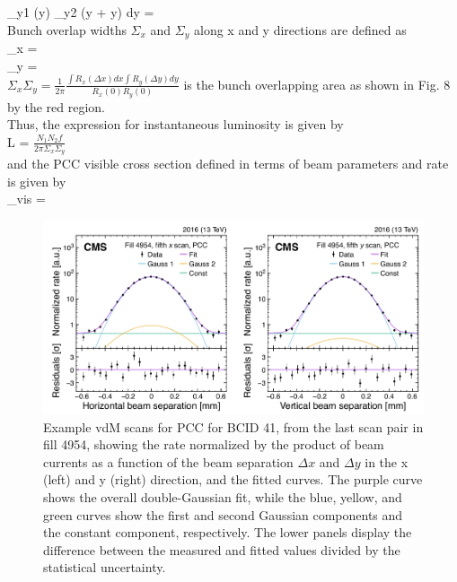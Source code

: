 \int \rho_{y1} (y) \rho_{y2} (y + \Delta y) dy =  \\

Bunch overlap widths $\Sigma_x$ and $\Sigma_y$ along x and y directions are defined as \\

\Sigma_x =   \\

\Sigma_y =    \\

$\Sigma_x \Sigma_y = \frac{1}{2 \pi} \frac{\int R_x(\Delta x)dx \int R_y(\Delta y) dy}{R_x(0) R_y(0)}$  is the bunch overlapping area as shown in Fig. 8 by the red region.\\

Thus, the expression for instantaneous luminosity is given by \\

L = $\frac{N_1 N_2 f}{2\pi \Sigma_x \Sigma_y}$ \\

and the PCC visible cross section defined in terms of beam parameters and rate is given by \\

\sigma_{vis} =  \\


\begin{figure}[H]
  \centering
  \includegraphics[width=0.7\columnwidth]{./vdmfit.png}
  \caption{ \onehalfspacing Example vdM scans for PCC for BCID 41, from the last scan pair in fill 4954, showing the rate normalized by the product of beam currents as a function of the beam separation $\Delta x$ and $\Delta y$ in the x (left) and y (right) direction, and the fitted curves. The purple curve shows the overall double-Gaussian fit, while the blue, yellow, and green curves show the first and second Gaussian components and the constant component, respectively. The lower panels display the difference between the measured and fitted values
divided by the statistical uncertainty\cite{CMS-PAS-LUM-15-001}.}
  \label{fig:CMS}
\end{figure}


